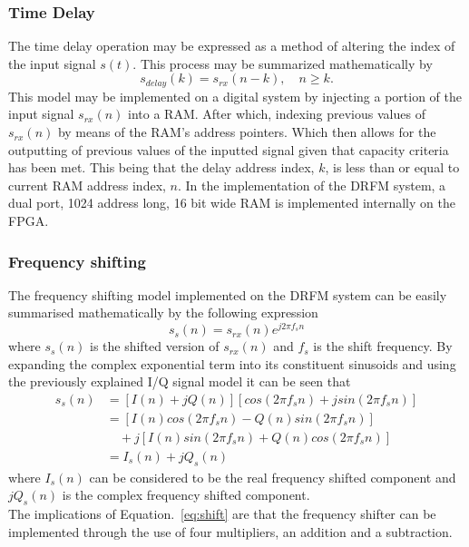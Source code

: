 	\subsubsection{Time Delay}
	 The time delay operation may be expressed as a method of altering the index of the input signal $s(t)$. This process may be summarized mathematically by
	\begin{equation}
		s_{delay}(k) = s_{rx}(n -k),\quad n \geq k.
	\end{equation}
	 \noindent This model may be implemented on a digital system by injecting a portion of the input signal $s_{rx}(n)$ into a RAM. After which, indexing previous values of $s_{rx}(n)$ by means of the RAM's address pointers. Which then allows for the outputting of previous values of the inputted signal given that capacity criteria has been met. This being that the delay address index, $k$, is less than or equal to current RAM address index, $n$. In the implementation of the DRFM system, a dual port, 1024 address long, 16 bit wide RAM is implemented internally on the FPGA. \\
	\subsubsection{Frequency shifting}
	The frequency shifting model implemented on the DRFM system can be easily summarised mathematically by the following expression 
	\begin{equation}
		s_{s}(n) = s_{rx}(n) e^{j2\pi f_{s}n}
	\end{equation} 
	\noindent where $s_{s}(n)$ is the shifted version of $s_{rx}(n)$ and $f_s$ is the shift frequency. By expanding the complex exponential term into its constituent sinusoids and using the previously explained I/Q signal model it can be seen that
	\begin{equation}
	\label{eq:shift}
		\begin{split}
			s_{s}(n) &= [I(n) +jQ(n)][cos(2\pi f_{s}n) +jsin(2\pi f_{s}n)] \\
			         &=  [I(n)cos(2\pi f_{s}n) - Q(n)sin(2\pi f_{s}n)] \\
			         &\quad+j[I(n)sin(2\pi f_{s}n) +Q(n)cos(2\pi f_{s}n)]\\
			         &= I_s(n) +jQ_s(n)
		\end{split}
	\end{equation}
	\noindent where $I_s(n)$ can be considered to be the real frequency shifted component and $jQ_s(n)$ is the complex frequency shifted component. \\ \newline The implications of Equation.~\ref{eq:shift} are that the frequency shifter can be implemented through the use of four multipliers, an addition and a subtraction.\\ 
	
